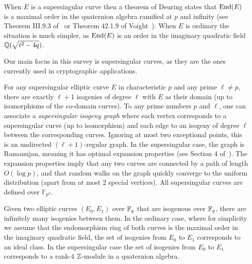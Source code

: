 When $E$ is a supersingular curve then a theorem of Deuring states that $\text{End}(E)$ is a maximal order in the quaternion algebra ramified at $p$ and infinity (see Theorem III.9.3 of~\cite{Silverman} or Theorem 42.1.9 of Voight~\cite{Voi21}).
When $E$ is ordinary the situation is much simpler, as $\text{End}(E)$ is an order in the imaginary quadratic field $\mathbb{Q}( \sqrt{t^2-4q})$.


Our main focus in this survey is supersingular curves, as they are the ones currently used in cryptographic applications.

For any supersingular elliptic curve $E$ in characteristic $p$ and any prime $\ell \ne p$, there are exactly $\ell+1$ isogenies of degree $\ell$ with $E$ as their domain (up to isomorphisms of the co-domain curves). 
%
To any prime numbers $p$ and $\ell$, one can associate a \emph{supersingular isogeny graph} where each vertex corresponds to a supersingular curve (up to isomorphism) and each edge to an isogeny of degree $\ell$ between the corresponding curves. Ignoring at most two exceptional points, this is an undirected $(\ell+1)$-regular graph.
%
In the supersingular case, the graph is Ramanujan, meaning it has optimal expansion properties (see Section 4 of~\cite{CGL}). The expansion properties imply that any two curves are connected by a path of length  $O(\log p)$, and that random walks on the graph quickly converge to the uniform distribution (apart from at most 2 special vertices).
%
All supersingular curves are defined over $\mathbb{F}_{p^2}$.



Given two elliptic curves $(E_0, E_1 )$ over $
\mathbb{F}_q$ that are isogenous over $\mathbb{F}_q$, there are infinitely many isogenies between them.
In the ordinary case, where for simplicity we assume that the endomorphism ring of both curves is the maximal order in the imaginary quadratic field, the set of isogenies from $E_0$ to $E_1$ corresponds to an ideal class. In the supersingular case the set of isogenies from $E_0$ to $E_1$ corresponds to a rank-4 $\mathbb{Z}$-module in a quaternion algebra.


